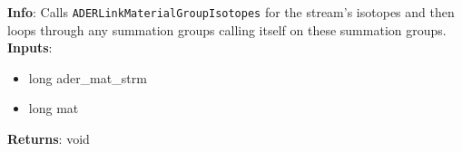 \textbf{Info}: Calls \texttt{ADERLinkMaterialGroupIsotopes} for the stream's
isotopes and then loops through any summation groups calling itself on these
summation groups.\\

\noindent \textbf{Inputs}:
\begin{itemize}
\item{long ader\_mat\_strm}
\item{long mat}
\end{itemize}

\noindent \textbf{Returns}: void
